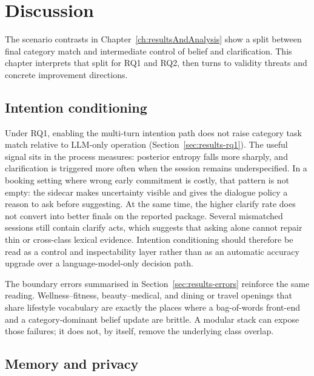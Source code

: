 
\chapter{Discussion}
\label{ch:discussion}

The scenario contrasts in Chapter~\ref{ch:resultsAndAnalysis} show a split between final category match and intermediate control of belief and clarification.
This chapter interprets that split for RQ1 and RQ2, then turns to validity threats and concrete improvement directions.

\section{Intention conditioning}
\label{sec:discussion-intention}

Under RQ1, enabling the multi-turn intention path does not raise category task match relative to LLM-only operation (Section~\ref{sec:results-rq1}).
The useful signal sits in the process measures: posterior entropy falls more sharply, and clarification is triggered more often when the session remains underspecified.
In a booking setting where wrong early commitment is costly, that pattern is not empty: the sidecar makes uncertainty visible and gives the dialogue policy a reason to ask before suggesting.
At the same time, the higher clarify rate does not convert into better finals on the reported package.
Several mismatched sessions still contain clarify acts, which suggests that asking alone cannot repair thin or cross-class lexical evidence.
Intention conditioning should therefore be read as a control and inspectability layer rather than as an automatic accuracy upgrade over a language-model-only decision path.

The boundary errors summarised in Section~\ref{sec:results-errors} reinforce the same reading.
Wellness--fitness, beauty--medical, and dining or travel openings that share lifestyle vocabulary are exactly the places where a bag-of-words front-end and a category-dominant belief update are brittle.
A modular stack can expose those failures; it does not, by itself, remove the underlying class overlap.

\section{Memory and privacy}
\label{sec:discussion-memory}

